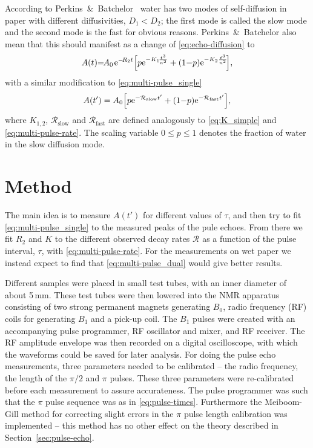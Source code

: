 \documentclass[11pt,a4paper, twocolumn,
swedish, english %
]{article}
\begin{document}
According to Perkins~\&~Batchelor~\cite{Perkins-Batchelor2012} water
has two modes of self-diffusion in paper with different diffusivities,
$D_1<D_2$; the first mode is called the slow mode and the second mode
is the fast for obvious reasons. Perkins~\&~Batchelor also mean that
this should manifest as a change of 
\eqref{eq:echo-diffusion} to
\begin{equation}
\begin{aligned}
A(t){=}\hspace{-1pt}A_0\hspace{1pt}
\mathrm{e}^{{-}\!R_2t}\qty[
p\mathrm{e}^{{-}K_1\!\frac{t^3}{n^2}} + (1{-}p)\mathrm{e}^{{-}K_2\frac{t^3}{n^2}}
\!],
\end{aligned}
\end{equation}
with a similar modification to \eqref{eq:multi-pulse_single}
\begin{equation}\label{eq:multi-pulse_dual}
A(t')=A_0\qty[p\mathrm{e}^{-\mathcal{R}_\text{slow} t'}+
(1{-}p)\mathrm{e}^{-\mathcal{R}_\text{fast} t'}],
\end{equation}
where $K_{1, 2}$, $\mathcal{R}_\text{slow}$ and
$\mathcal{R}_\text{fast}$ are defined analogously to
\eqref{eq:K_simple} and \eqref{eq:multi-pulse-rate}. The
scaling variable $0\le p\le1$ denotes the fraction of water in the
slow diffusion mode. 



\section{Method} \label{sec:met}
The main idea is to measure $A(t')$ for different values of $\tau$,
and then try to fit \eqref{eq:multi-pulse_single} to the measured
peaks of the pule echoes. From there we fit $R_2$ and $K$ to the
different observed decay rates $\mathcal{R}$ as a function of the
pulse interval, $\tau$, with \eqref{eq:multi-pulse-rate}. For the
measurements on wet paper we instead expect to find that
\eqref{eq:multi-pulse_dual} would give better results.

Different samples were placed in small test tubes, with an inner
diameter of about 5\,mm. These test tubes were then lowered into the
NMR apparatus\footnotemark{} consisting of two strong permanent
magnets generating $B_0$, radio frequency (RF) coils for generating
$B_1$ and a pick-up coil. The $B_1$ pulses were created with an
accompanying pulse programmer, RF oscillator and mixer, and RF
receiver. The RF amplitude envelope was then recorded on a digital
oscilloscope, with which the waveforms could be saved for later
analysis. For doing the pulse echo measurements, three parameters
needed to be calibrated -- the radio frequency, the length of the
$\pi/2$ and $\pi$ pulses. These three parameters were re-calibrated
before each measurement to assure accurateness. The pulse programmer
was such that the $\pi$ pulse sequence was as in
\eqref{eq:pulse-times}. Furthermore the
Meiboom-Gill\cite{Meiboom-Gill1958} method for correcting slight
errors in the $\pi$ pulse length calibration was implemented -- this
method has no other effect on the theory described in
Section~\ref{sec:pulse-echo}. 
\end{document}
